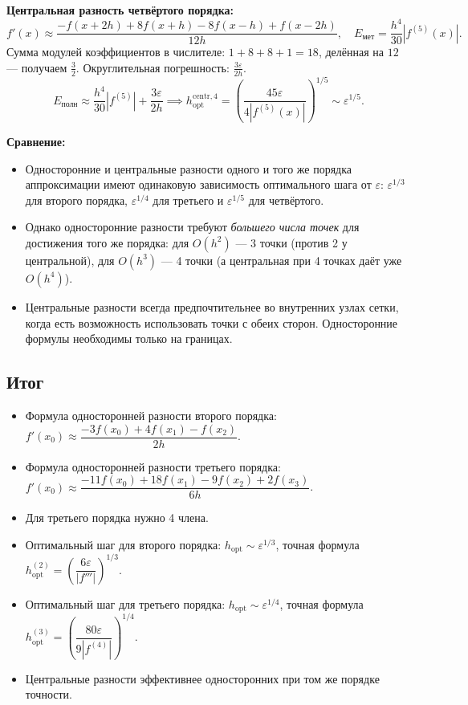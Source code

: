 \documentclass{article}
\begin{document}
\textbf{Центральная разность четвёртого порядка:}
\begin{equation}
f'(x) \approx \frac{-f(x+2h) + 8f(x+h) - 8f(x-h) + f(x-2h)}{12h}, \quad E_{\text{мет}} = \frac{h^4}{30} |f^{(5)}(x)|.
\end{equation}
Сумма модулей коэффициентов в числителе: $1 + 8 + 8 + 1 = 18$, делённая на $12$ --- получаем $\tfrac{3}{2}$. Округлительная погрешность: $\tfrac{3\varepsilon}{2h}$.
\begin{equation}
E_{\text{полн}} \approx \frac{h^4}{30} |f^{(5)}| + \frac{3\varepsilon}{2h} \implies h_{\text{opt}}^{\text{centr},4} = \left(\frac{45\varepsilon}{4|f^{(5)}(x)|}\right)^{1/5} \sim \varepsilon^{1/5}.
\end{equation}

\textbf{Сравнение:}
\begin{itemize}
\item Односторонние и центральные разности одного и того же порядка аппроксимации имеют одинаковую зависимость оптимального шага от $\varepsilon$: $\varepsilon^{1/3}$ для второго порядка, $\varepsilon^{1/4}$ для третьего и $\varepsilon^{1/5}$ для четвёртого.
\item Однако односторонние разности требуют \textit{большего числа точек} для достижения того же порядка: для $O(h^2)$ --- 3 точки (против 2 у центральной), для $O(h^3)$ --- 4 точки (а центральная при 4 точках даёт уже $O(h^4)$).
\item Центральные разности всегда предпочтительнее во внутренних узлах сетки, когда есть возможность использовать точки с обеих сторон. Односторонние формулы необходимы только на границах.
\end{itemize}

\subsection*{Итог}

\begin{itemize}
\item Формула односторонней разности второго порядка: $f'(x_0) \approx \dfrac{-3f(x_0) + 4f(x_1) - f(x_2)}{2h}$.
\item Формула односторонней разности третьего порядка: $f'(x_0) \approx \dfrac{-11f(x_0) + 18f(x_1) - 9f(x_2) + 2f(x_3)}{6h}$.
\item Для третьего порядка нужно 4 члена.
\item Оптимальный шаг для второго порядка: $h_{\text{opt}} \sim \varepsilon^{1/3}$, точная формула $h_{\text{opt}}^{(2)} = \left(\dfrac{6\varepsilon}{|f'''|}\right)^{1/3}$.
\item Оптимальный шаг для третьего порядка: $h_{\text{opt}} \sim \varepsilon^{1/4}$, точная формула $h_{\text{opt}}^{(3)} = \left(\dfrac{80\varepsilon}{9|f^{(4)}|}\right)^{1/4}$.
\item Центральные разности эффективнее односторонних при том же порядке точности.
\end{itemize}
\end{document}
